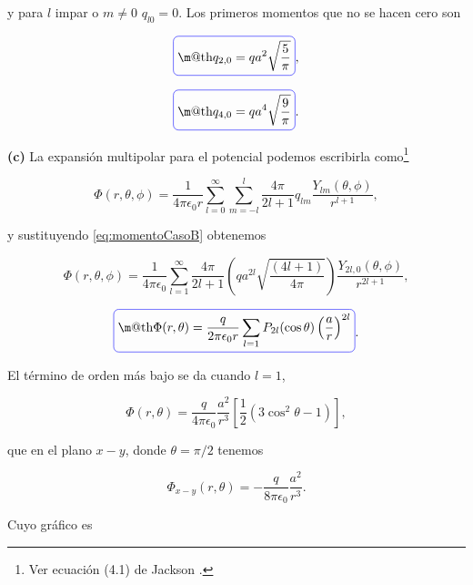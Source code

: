 \documentclass[a4paper,11pt]{article}
\makeatletter
\numberwithin{equation}{section}
\newcommand*{\boxcolor}{blue}
\renewcommand{\boxed}[1]{\textcolor{\boxcolor}{%
\tikz[baseline={([yshift=-1ex]current bounding box.center)}] \node [rectangle, minimum width=1ex,rounded corners,draw] {\normalcolor\m@th$\displaystyle#1$};}}
\makeatother
\begin{document}
y para $l$ impar o $m \neq 0$ $q_{l0} = 0$. Los primeros momentos que 
no se hacen cero son 

\begin{equation}
 \boxed{q_{2,0} = qa^2\sqrt{\frac{5}{\pi}}},
\end{equation}

\begin{equation}
 \boxed{q_{4,0} = qa^4\sqrt{\frac{9}{\pi}}}.
\end{equation}

\textbf{(c)} La expansión multipolar para el potencial podemos escribirla como\footnote{Ver 
ecuación (4.1) de Jackson \cite{jackson}.} 

\begin{equation}
 \Phi(r,\theta,\phi) = \frac{1}{4\pi\epsilon_0 r}\sum_{l=0}^\infty 
 \sum_{m=-l}^l \frac{4\pi}{2l+1} 
 q_{lm} \frac{Y_{lm}(\theta,\phi)}{r^{l+1}},
\end{equation}

y sustituyendo \eqref{eq:momentoCasoB} obtenemos 

\begin{equation}
 \Phi(r,\theta,\phi) = \frac{1}{4\pi\epsilon_0}\sum_{l=1}^\infty \frac{4\pi}{2l+1}  
 \left(qa^{2l}\sqrt{\frac{(4l+1)}{4\pi}} \right)\frac{Y_{2l,0}(\theta,\phi)}{r^{2l+1}},
\end{equation}

\begin{equation}
 \boxed{\Phi(r,\theta) = \frac{q}{2\pi\epsilon_0 r}\sum_{l=1}P_{2l}(\cos{\theta})
 \left(\frac{a}{r}\right)^{2l}}.
\end{equation}

El término de orden más bajo se da cuando $l=1$, 

\begin{equation}
 \Phi(r,\theta) = \frac{q}{4\pi\epsilon_0}\frac{a^2}{r^3}\left[ 
 \frac{1}{2}(3\cos^2{\theta} - 1)\right],
\end{equation}

que en el plano $x-y$, donde $\theta = \pi/2$ tenemos 

\begin{equation}
 \Phi_{x-y}(r,\theta) = - \frac{q}{8\pi\epsilon_0}\frac{a^2}{r^3}.
\end{equation}

Cuyo gráfico es 
\end{document}
